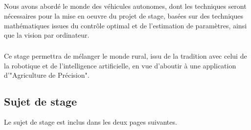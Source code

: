 \documentclass[12pt,a4paper]{report}
\begin{document}
\paragraph{} Nous avons abordé le monde des véhicules autonomes, dont les techniques seront nécessaires pour la mise en oeuvre du projet de stage, basées sur des techniques mathématiques issues du contrôle optimal et de l'estimation de paramètres, ainsi que la vision par ordinateur.

\paragraph{} Ce stage permettra de mélanger le monde rural, issu de la tradition avec celui de la robotique et de l'intelligence artificielle, en vue d'aboutir à une application d'"Agriculture de Précision".

\begin{appendix}
\chapter{Sujet de stage}
Le sujet de stage est inclus dans les deux pages suivantes.

\end{appendix}



\end{document}
